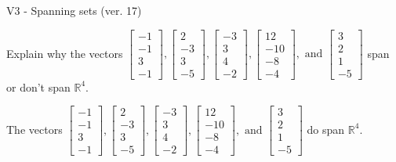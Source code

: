\begin{exercise}
  \begin{exerciseTitle}V3 - Spanning sets (ver. 17)\end{exerciseTitle}
  \begin{exerciseStatement}
    Explain why the vectors \(\left[\begin{array}{r}
-1 \\
-1 \\
3 \\
-1
\end{array}\right] , \left[\begin{array}{r}
2 \\
-3 \\
3 \\
-5
\end{array}\right] , \left[\begin{array}{r}
-3 \\
3 \\
4 \\
-2
\end{array}\right] , \left[\begin{array}{r}
12 \\
-10 \\
-8 \\
-4
\end{array}\right] , \text{ and } \left[\begin{array}{r}
3 \\
2 \\
1 \\
-5
\end{array}\right]\) span or don't span \(\mathbb{R}^4\). 
	


  \end{exerciseStatement}
  \begin{exerciseAnswer}
   The vectors \(\left[\begin{array}{r}
-1 \\
-1 \\
3 \\
-1
\end{array}\right] , \left[\begin{array}{r}
2 \\
-3 \\
3 \\
-5
\end{array}\right] , \left[\begin{array}{r}
-3 \\
3 \\
4 \\
-2
\end{array}\right] , \left[\begin{array}{r}
12 \\
-10 \\
-8 \\
-4
\end{array}\right] , \text{ and } \left[\begin{array}{r}
3 \\
2 \\
1 \\
-5
\end{array}\right]\) 
  	 do  
	span \(\mathbb{R}^4\).
  



\end{exerciseAnswer}
\end{exercise}
